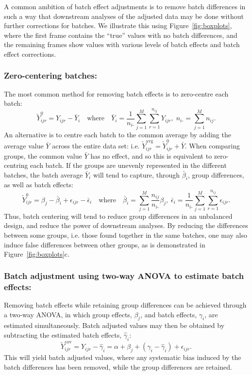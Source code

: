 \documentclass{bio}
\begin{document}
A common ambition of batch effect adjustments is to remove batch differences in such a way that downstream analyses of the adjusted data may be done without further corrections for batches. We illustrate this using Figure~\ref{fig:boxplots}, where the first frame contains the ``true'' values with no batch differences, and the remaining frames show values with various levels of batch effects and batch effect corrections.

\subsubsection{Zero-centering batches:}

The most common method for removing batch effects is to zero-centre each batch:
\begin{equation}
\tilde{Y}^0_{ijr}=Y_{ijr}-\bar{Y}_{i}
\quad\text{where}\quad
\bar{Y}_i=\frac{1}{n_{i\textrm{-}}} \sum_{j=1}^M\sum_{r=1}^{n_{ij}} Y_{ijr},\;
n_{i\textrm{-}}=\sum_{j=1}^M n_{ij}.
\end{equation}
An alternative is to centre each batch to the common average by adding the average value $\bar{Y}$ across the entire data set: i.e. $\tilde{Y}^{\textrm{avg}}_{ijr}=\tilde{Y}^0_{ijr}+\bar{Y}$. When comparing groups, the common value $\bar{Y}$ has no effect, and so this is equivalent to zero-centring each batch. If the groups are unevenly represented in the different batches, the batch average $\bar{Y}_i$ will tend to capture, through $\bar\beta_i$, group differences, as well as batch effects:
\begin{equation}
\tilde{Y}^0_{ijr}=\beta_j-\bar{\beta}_i+\epsilon_{ijr}-\bar{\epsilon}_i
\quad\text{where}\quad
\bar{\beta}_i={\sum_{j=1}^M \frac{n_{ij}}{n_{i\textrm{-}}}\beta_j},\;
\bar{\epsilon}_i=\frac{1}{n_{i\textrm{-}}} \sum_{j=1}^M\sum_{r=1}^{n_{ij}} \epsilon_{ijr}.
\end{equation}
Thus, batch centering will tend to reduce group differences in an unbalanced design, and reduce the power of downstream analyses. By reducing the differences between some groups, i.e. those found together in the same batches, one may also induce false differences between other groups, as is demonstrated in Figure~\ref{fig:boxplots}c.

\subsubsection{Batch adjustment using two-way ANOVA to estimate batch effects:}

Removing batch effects while retaining group differences can be achieved through a two-way ANOVA, in which group effects, $\beta_j$, and batch effects, $\gamma_i$, are estimated simultaneously. Batch adjusted values may then be obtained by subtracting the estimated batch effects, $\hat\gamma_i$:
\begin{equation}
\tilde{Y}^{\textrm{cov}}_{ijr}=Y_{ijr}-\hat\gamma_i=\alpha+\beta_j+(\gamma_i-\hat\gamma_i)+\epsilon_{ijr}.
\end{equation}
This will yield batch adjusted values, where any systematic bias induced by the batch differences has been removed, while the group differences are retained.
\end{document}
